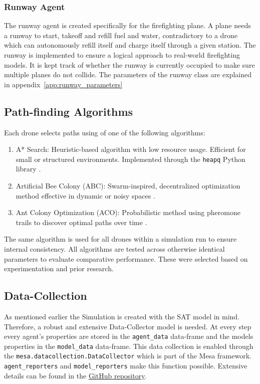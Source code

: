 \documentclass[11pt, a4paper]{article}
\begin{document}
\subsubsection{Runway Agent}
\label{sec:RunwayClass}
The runway agent is created specifically for the firefighting plane. A plane needs a runway to start, takeoff and refill fuel and water, contradictory to a drone which can autonomously refill itself and charge itself through a given station. The runway is implemented to ensure a logical approach to real-world firefighting models. It is kept track of whether the runway is currently occupied to make sure multiple planes do not collide. The parameters of the runway class are explained in appendix~\ref{app:runway_parameters}

\subsection{Path-finding Algorithms}
Each drone selects paths using of one of the following algorithms:
\begin{enumerate}
    \item A* Search: Heuristic-based algorithm with low resource usage. Efficient for small or structured environments. Implemented through the \texttt{heapq} Python library \citep{python-heapq}.
    \item Artificial Bee Colony (ABC): Swarm-inspired, decentralized optimization method effective in dynamic or noisy spaces \citep{karaboga2007abc}.
    \item Ant Colony Optimization (ACO): Probabilistic method using pheromone trails to discover optimal paths over time \citep{ACO}.
\end{enumerate}

The same algorithm is used for all drones within a simulation run to ensure internal consistency. All algorithms are tested across otherwise identical parameters to evaluate comparative performance. These were selected based on experimentation and prior research.

\subsection{Data-Collection}

As mentioned earlier the Simulation is created with the SAT model in mind. Therefore, a robust and extensive Data-Collector model is needed. At every step every agent's properties are stored in the \texttt{agent\_data} data-frame and the models properties in the \texttt{model\_data} data-frame. This data collection is enabled through the \texttt{mesa.datacollection.DataCollector{}} which is part of the Mesa framework. \texttt{agent\_reporters} and \texttt{model\_reporters} make this function possible. Extensive details can be found in the \href{https://github.com/kaispeidel/Autonomous-Drone-Firefighting-Simulation}{GitHub repository}.
\end{document}
